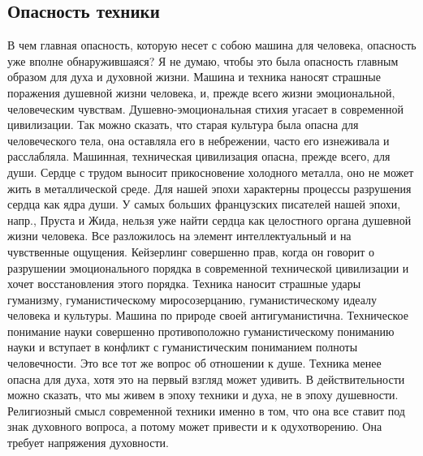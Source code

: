 \subsection{Опасность техники}

В чем главная опасность, которую несет с собою машина для человека, опасность 
уже вполне обнаружившаяся? Я не думаю, чтобы это была опасность главным 
образом для духа и духовной жизни. Машина и техника наносят страшные поражения 
душевной жизни человека, и, прежде всего жизни эмоциональной, человеческим 
чувствам. Душевно-эмоциональная стихия угасает в современной цивилизации. 
Так можно сказать, что старая культура была опасна для человеческого тела, она 
оставляла его в небрежении, часто его изнеживала и расслабляла. Машинная, 
техническая цивилизация опасна, прежде всего, для души. Сердце с трудом 
выносит прикосновение холодного металла, оно не может жить в металлической 
среде. Для нашей эпохи характерны процессы разрушения сердца как ядра души. 
У самых больших французских писателей нашей эпохи, напр., Пруста и Жида, 
нельзя уже найти сердца как целостного органа душевной жизни человека. Все 
разложилось на элемент интеллектуальный и на чувственные ощущения. Кейзерлинг 
совершенно прав, когда он говорит о разрушении эмоционального порядка в 
современной технической цивилизации и хочет восстановления этого порядка. 
Техника наносит страшные удары гуманизму, гуманистическому миросозерцанию, 
гуманистическому идеалу человека и культуры. Машина по природе своей 
антигуманистична. Техническое понимание науки совершенно противоположно 
гуманистическому пониманию науки и вступает в конфликт с гуманистическим 
пониманием полноты человечности. Это все тот же вопрос об отношении к душе. 
Техника менее опасна для духа, хотя это на первый взгляд может удивить. В 
действительности можно сказать, что мы живем в эпоху техники и духа, не в 
эпоху душевности. Религиозный смысл современной техники именно в том, что она 
все ставит под знак духовного вопроса, а потому может привести и к 
одухотворению. Она требует напряжения духовности.

